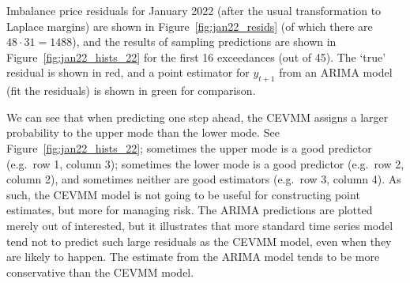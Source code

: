 \documentclass[11pt,twoside,openany]{book}
\numberwithin{Theorem}{chapter}
\numberwithin{Definition}{chapter}
\numberwithin{Lemma}{chapter}
\numberwithin{Algorithm}{chapter}
\numberwithin{equation}{chapter}
\begin{document}




Imbalance price residuals for January 2022 (after the usual transformation to Laplace
margins) are shown in Figure~\ref{fig:jan22_resids} (of which there are
$48\cdot31 = 1488$), and the results of sampling predictions are
shown in Figure~\ref{fig:jan22_hists_22} for the first 16 exceedances (out of 45).
The `true' residual is shown in red, and a point estimator for $y_{t+1}$ from an ARIMA model
(fit the residuals) is shown in green for comparison.


We can see that when predicting one step ahead, the CEVMM assigns
a larger probability to the upper mode than the lower mode.
See Figure~\ref{fig:jan22_hists_22};
sometimes the upper mode is a good predictor (e.g.\ row 1, column 3);
sometimes the lower mode is a good predictor (e.g.\ row 2, column 2),
and sometimes neither are good estimators (e.g.\ row 3, column 4).
As such, the CEVMM model is not going to be useful for
constructing point estimates, but more for managing risk.
The ARIMA predictions are plotted merely out of interested, but it illustrates
that more standard time series model tend not to predict such large residuals
as the CEVMM model, even when they are likely to happen.
The estimate from the ARIMA model tends to be more conservative than the CEVMM model.
\end{document}
